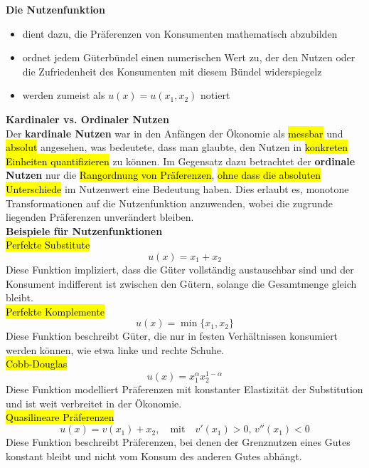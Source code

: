 \documentclass[a4paper, 10pt]{article}
\begin{document}
\noindent \textbf{Die Nutzenfunktion}
\begin{itemize}
    \item dient dazu, die Präferenzen von Konsumenten mathematisch abzubilden
    \item ordnet jedem Güterbündel einen numerischen Wert zu, der den Nutzen oder die Zufriedenheit des Konsumenten mit diesem Bündel widerspiegelz
    \item werden zumeist als $u(x) = u (x_1, x_2)$ notiert
\end{itemize}

\noindent \textbf{Kardinaler vs. Ordinaler Nutzen}\\
Der \textbf{kardinale Nutzen} war in den Anfängen der Ökonomie als \hl{messbar} und \hl{absolut} angesehen, was bedeutete, dass man glaubte, den Nutzen in \hl{konkreten Einheiten quantifizieren} zu können. Im Gegensatz dazu betrachtet der \textbf{ordinale Nutzen} nur die \hl{Rangordnung von Präferenzen}, \hl{ohne dass die absoluten Unterschiede} im Nutzenwert eine Bedeutung haben. Dies erlaubt es, monotone Transformationen auf die Nutzenfunktion anzuwenden, wobei die zugrunde liegenden Präferenzen unverändert bleiben.\\

\noindent\textbf{Beispiele für Nutzenfunktionen}\\
\hl{Perfekte Substitute}
\begin{equation}
    u(x) = x_1 + x_2
\end{equation}
Diese Funktion impliziert, dass die Güter vollständig austauschbar sind und der Konsument indifferent ist zwischen den Gütern, solange die Gesamtmenge gleich bleibt.\\

\noindent\hl{Perfekte Komplemente}
\begin{equation}
    u(x) = \min\{x_1, x_2\}
\end{equation}
Diese Funktion beschreibt Güter, die nur in festen Verhältnissen konsumiert werden können, wie etwa linke und rechte Schuhe.\\

\noindent\hl{Cobb-Douglas}
\begin{equation}
    u(x) = x_1^{\alpha} x_2^{1-\alpha}
\end{equation}
Diese Funktion modelliert Präferenzen mit konstanter Elastizität der Substitution und ist weit verbreitet in der Ökonomie.\\

\noindent \hl{Quasilineare Präferenzen}
\begin{equation}
    u(x) = v(x_1) + x_2, \quad \text{mit} \quad v'(x_1) > 0, \, v''(x_1) < 0
\end{equation}
Diese Funktion beschreibt Präferenzen, bei denen der Grenznutzen eines Gutes konstant bleibt und nicht vom Konsum des anderen Gutes abhängt.\\
\end{document}
